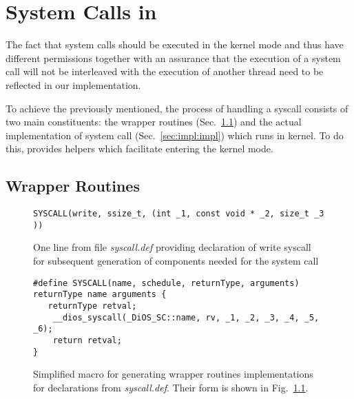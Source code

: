 \chapter{ System Calls in \divine } \label{chap:impl}
    
The fact that system calls should be executed in the kernel mode and thus have different permissions together with an assurance that the execution of a system call will not be interleaved with the execution of another thread need to be reflected in our implementation.

To achieve the previously mentioned, the process of handling a syscall consists of two main constituents: the wrapper routines (Sec.~\ref{sec:impl:wrapper}) and the actual implementation of system call (Sec.~\ref{sec:impl:impl}) which runs in \dios kernel. To do this, \dios provides helpers which facilitate entering the kernel mode.

\section{ Wrapper Routines } \label{sec:impl:wrapper}

\begin{figure}[h!]
\begin{lstlisting}[style=C]
SYSCALL(write, ssize_t, (int _1, const void * _2, size_t _3 ))
\end{lstlisting}
\caption{ One line from file \textit{syscall.def} providing declaration of write syscall for subsequent generation of components needed for the system call  }
\label{fig:impl:declaration}
\end{figure}


\begin{figure}[h!]
\begin{lstlisting}[style=Macro]
#define SYSCALL(name, schedule, returnType, arguments)                             
returnType name arguments {                                                
   returnType retval;                                                    
    __dios_syscall(_DiOS_SC::name, rv, _1, _2, _3, _4, _5, _6);
    return retval;                                                     
}
\end{lstlisting}
\caption{
       Simplified macro for generating wrapper routines implementations for declarations from \textit{syscall.def}. Their form is shown in Fig.~\ref{fig:impl:declaration}.
    }
  \label{fig:impl:wrapper}
\end{figure}


